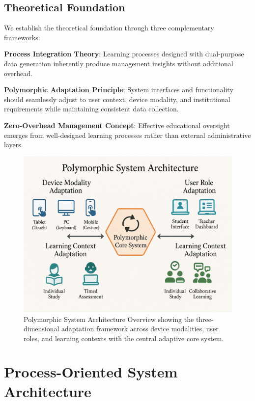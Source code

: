 \documentclass[conference]{IEEEtran}
\begin{document}
\subsection{Theoretical Foundation}
We establish the theoretical foundation through three complementary frameworks:

\textbf{Process Integration Theory}: Learning processes designed with dual-purpose data generation inherently produce management insights without additional overhead.

\textbf{Polymorphic Adaptation Principle}: System interfaces and functionality should seamlessly adjust to user context, device modality, and institutional requirements while maintaining consistent data collection.

\textbf{Zero-Overhead Management Concept}: Effective educational oversight emerges from well-designed learning processes rather than external administrative layers.

\begin{figure}[htbp]
\centerline{\includegraphics[width=\columnwidth]{1.png}}
\caption{Polymorphic System Architecture Overview showing the three-dimensional adaptation framework across device modalities, user roles, and learning contexts with the central adaptive core system.}
\label{fig:architecture}
\end{figure}

\section{Process-Oriented System Architecture}
\end{document}
